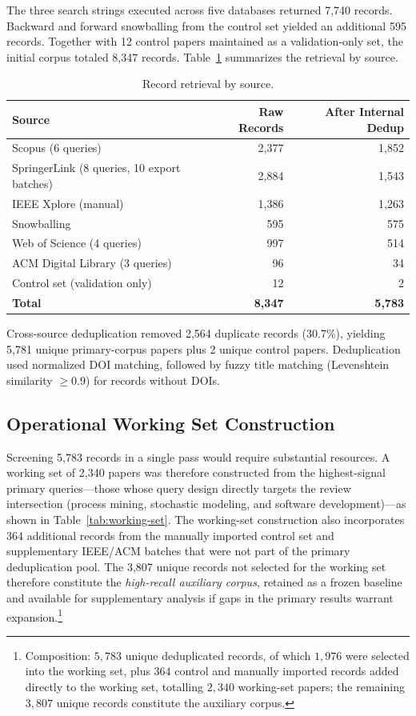 The three search strings executed across five databases returned 7{,}740
records. Backward and forward snowballing from the control set yielded an
additional 595 records. Together with 12 control papers maintained as a
validation-only set, the initial corpus totaled 8{,}347 records.
Table~\ref{tab:retrieval} summarizes the retrieval by source.

\begin{table}[htbp]
\centering
\caption{Record retrieval by source.}
\label{tab:retrieval}
\begin{tabular}{lrr}
\toprule
\textbf{Source} & \textbf{Raw Records} & \textbf{After Internal Dedup} \\
\midrule
Scopus (6 queries)      & 2{,}377 & 1{,}852 \\
SpringerLink (8 queries, 10 export batches) & 2{,}884 & 1{,}543 \\
IEEE Xplore (manual)    & 1{,}386 & 1{,}263 \\
Snowballing             &   595   &   575   \\
Web of Science (4 queries) & 997  &   514   \\
ACM Digital Library (3 queries) & 96 &  34  \\
Control set (validation only) & 12 &    2   \\
\midrule
\textbf{Total} & \textbf{8{,}347} & \textbf{5{,}783} \\
\bottomrule
\end{tabular}
\end{table}

Cross-source deduplication removed 2{,}564 duplicate records (30.7\%),
yielding 5{,}781 unique primary-corpus papers plus 2 unique control papers.
Deduplication used normalized DOI matching, followed by fuzzy title matching
(Levenshtein similarity $\geq 0.9$) for records without DOIs.

\subsection{Operational Working Set Construction}

Screening 5{,}783 records in a single pass would require substantial
resources. A working set of 2{,}340 papers was therefore constructed from
the highest-signal primary queries---those whose query design directly
targets the review intersection (process mining, stochastic modeling,
and software development)---as shown in Table~\ref{tab:working-set}. The
working-set construction also incorporates 364 additional records from the
manually imported control set and supplementary IEEE/ACM batches that were
not part of the primary deduplication pool. The 3{,}807 unique records not
selected for the working set therefore constitute the \textit{high-recall
auxiliary corpus}, retained as a frozen baseline and available for
supplementary analysis if gaps in the primary results warrant
expansion.\footnote{Composition: $5{,}783$ unique deduplicated records,
of which $1{,}976$ were selected into the working set, plus $364$ control
and manually imported records added directly to the working set, totalling
$2{,}340$ working-set papers; the remaining $3{,}807$ unique records
constitute the auxiliary corpus.}


